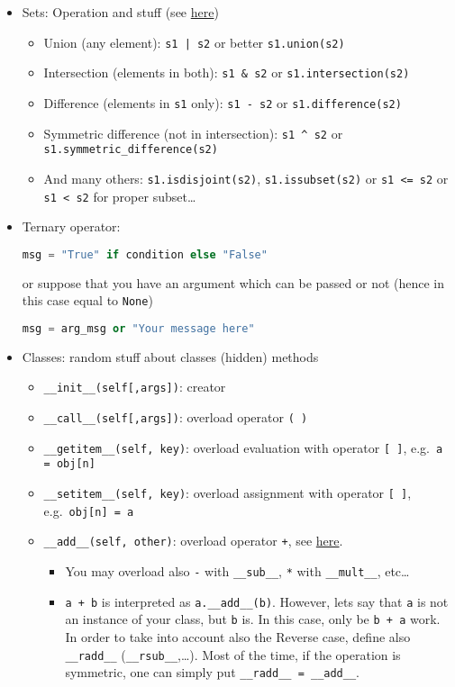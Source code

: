 \documentclass[a4paper,12pt,%
              final%
              ]{article}
\begin{document}
\begin{itemize}
  \item Sets: Operation and stuff (see \href{https://realpython.com/python-sets/}{here})
    \begin{itemize}
      \item Union (any element): \verb!s1 | s2! or better \verb|s1.union(s2)|
      \item Intersection (elements in both): \verb|s1 & s2| or \verb|s1.intersection(s2)|
      \item Difference (elements in \verb|s1| only): \verb|s1 - s2| or \verb|s1.difference(s2)|
      \item Symmetric difference (not in intersection): \verb|s1 ^ s2| or \verb|s1.symmetric_difference(s2)|
      \item And many others: \verb|s1.isdisjoint(s2)|, \verb|s1.issubset(s2)| or \verb|s1 <= s2| or \verb|s1 < s2| for proper subset\ldots
    \end{itemize}
  \item Ternary operator:
\begin{lstlisting}[language=python]
msg = "True" if condition else "False"
\end{lstlisting}
    or suppose that you have an argument which can be passed or not (hence in this case equal to \verb|None|)
\begin{lstlisting}[language=python]
msg = arg_msg or "Your message here"
\end{lstlisting}
  \item Classes: random stuff about classes (hidden) methods
    \begin{itemize}
      \item \verb|__init__(self[,args])|: creator
      \item \verb|__call__(self[,args])|: overload operator \verb|( )|
      \item \verb|__getitem__(self, key)|: overload evaluation with operator \verb|[ ]|, e.g.~\verb|a = obj[n]|
      \item \verb|__setitem__(self, key)|: overload assignment with operator \verb|[ ]|, e.g.~\verb|obj[n] = a|
      \item \verb|__add__(self, other)|: overload operator \verb|+|, see \href{https://docs.python.org/3/reference/datamodel.html#emulating-numeric-types}{here}.
        \begin{itemize}
          \item You may overload also \verb|-| with \verb|__sub__|, \texttt{*} with \verb|__mult__|, etc\ldots
          \item \verb|a + b| is interpreted as \verb|a.__add__(b)|. However, lets say that \texttt{a} is not an instance of your class, but \verb|b| is. In this case, only be \verb|b + a| work. In order to take into account also the Reverse case, define also \verb|__radd__| (\verb|__rsub__|,\ldots). Most of the time, if the operation is symmetric, one can simply put \verb|__radd__ = __add__|.

\end{itemize}
\end{itemize}
\end{itemize}
\end{document}
